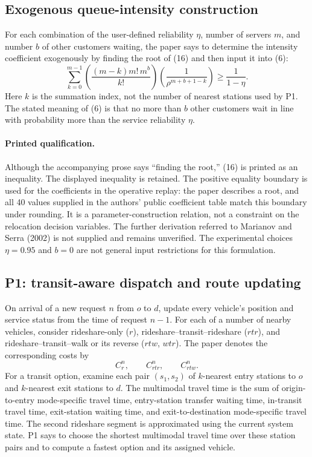 \documentclass{article}
\begin{document}
\subsection*{Exogenous queue-intensity construction}
For each combination of the user-defined reliability $\eta$, number of servers $m$, and number $b$ of other customers waiting, the paper says to determine the intensity coefficient exogenously by finding the root of (16) and then input it into (6):
\begin{equation}
\sum_{k=0}^{m-1}
\left(\frac{(m-k)m!\,m^b}{k!}\right)
\left(\frac{1}{\rho^{m+b+1-k}}\right)
\geq\frac{1}{1-\eta}.\tag{16}
\end{equation}
Here $k$ is the summation index, not the number of nearest stations used by P1. The stated meaning of (6) is that no more than $b$ other customers wait in line with probability more than the service reliability $\eta$.

\paragraph{Printed qualification.}
Although the accompanying prose says ``finding the root,'' (16) is printed as an inequality. The displayed inequality is retained. The positive equality boundary is used for the coefficients in the operative replay: the paper describes a root, and all 40 values supplied in the authors' public coefficient table match this boundary under rounding. It is a parameter-construction relation, not a constraint on the relocation decision variables. The further derivation referred to Marianov and Serra (2002) is not supplied and remains unverified. The experimental choices $\eta=0.95$ and $b=0$ are not general input restrictions for this formulation.

\subsection*{P1: transit-aware dispatch and route updating}
On arrival of a new request $n$ from $o$ to $d$, update every vehicle's position and service status from the time of request $n-1$. For each of a number of nearby vehicles, consider rideshare-only ($r$), rideshare--transit--rideshare ($rtr$), and rideshare--transit--walk or its reverse ($rtw$, $wtr$). The paper denotes the corresponding costs by
\[
C_r^n,\qquad C_{rtr}^n,\qquad C_{rtw}^n.
\]
For a transit option, examine each pair $(s_1,s_2)$ of $k$-nearest entry stations to $o$ and $k$-nearest exit stations to $d$. The multimodal travel time is the sum of origin-to-entry mode-specific travel time, entry-station transfer waiting time, in-transit travel time, exit-station waiting time, and exit-to-destination mode-specific travel time. The second rideshare segment is approximated using the current system state. P1 says to choose the shortest multimodal travel time over these station pairs and to compute a fastest option and its assigned vehicle.
\end{document}
